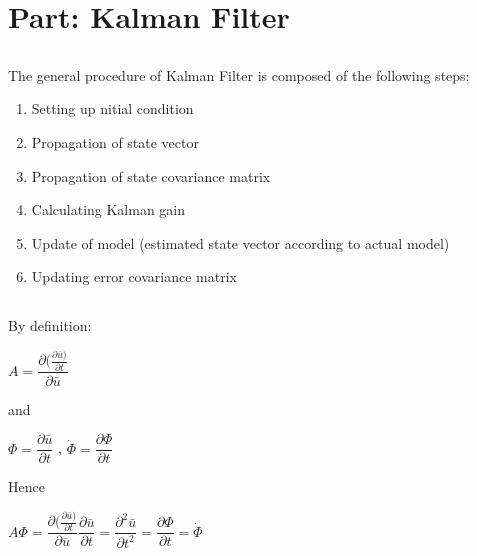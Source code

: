 \section{Part: Kalman Filter }\label{sec:q4}    

\subsection{}
The general procedure of Kalman Filter is composed of the following steps:
\begin{enumerate}
	\item Setting up nitial condition
	\item Propagation of state vector
	\item Propagation of state covariance matrix
	\item Calculating Kalman gain
	\item Update of model (estimated state vector according to actual model)
	\item Updating error covariance matrix
\end{enumerate}

\subsection{}

By definition:
\begin{center}
	$A = \dfrac{\partial (\frac{\partial \bar{u})}{\partial t}}{\partial \bar{u}}$
\end{center}
and
\begin{center}
	$\Phi = \dfrac{\partial \bar{u}}{\partial t}$ , $\dot{\Phi} = \dfrac{\partial \Phi}{\partial t}$
\end{center}
Hence
\begin{center}
	$A \Phi = \dfrac{\partial (\frac{\partial \bar{u})}{\partial t}}{\partial \bar{u}} \dfrac{\partial \bar{u}}{\partial t} = \dfrac{\partial^2 \bar{u}}{\partial t^2} = \dfrac{\partial \Phi}{\partial t} = \dot{\Phi}$
\end{center}


